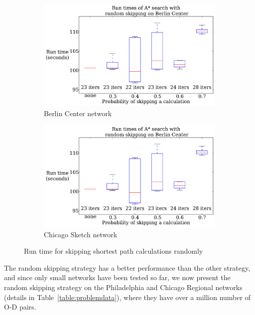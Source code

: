 \begin{figure}[H]
    \centering
    \begin{subfigure}{.5\textwidth}
        \centering
        \includegraphics[page=1,width=\textwidth]{img/random_time}
        \caption{Berlin Center network}
        \label{fig:berlin_random_n}
    \end{subfigure}%
    \begin{subfigure}{.5\textwidth}
        \centering
        \includegraphics[page=2,width=\textwidth]{img/random_time}
        \caption{Chicago Sketch network}
        \label{fig:chicago_random_n}
    \end{subfigure}
    \caption{Run time for skipping shortest path calculations randomly}
    \label{fig:random_n}
\end{figure}

The random skipping strategy has a better performance than the other strategy,
and since only small networks have been tested so far,
we now present the random skipping strategy on the Philadelphia and Chicago Regional networks (details in Table~\ref{table:problemdata}), where they have over a million number of O-D pairs.

